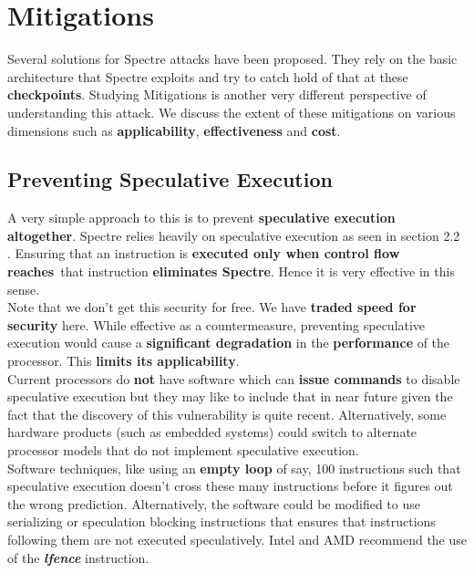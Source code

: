 \documentclass[12pt]{article}
\begin{document}
\newpage
\section{Mitigations\cite{Kocher2018spectre}}
Several solutions for Spectre attacks have been proposed. They rely on the basic architecture that Spectre exploits and try to catch hold of that at these \textbf{checkpoints}. Studying Mitigations is another very different perspective of understanding this attack. We discuss the extent of these mitigations on various dimensions such as \textbf{applicability}, \textbf{effectiveness} and \textbf{cost}.
\subsection{Preventing Speculative Execution}
A very simple approach to this is to prevent \textbf{speculative execution altogether}. Spectre relies heavily on speculative execution as seen in section 2.2 . Ensuring that an instruction is \textbf{executed only when control flow reaches}\ that instruction \textbf{eliminates Spectre}. Hence it is very effective in this sense.\\

 Note that we don't get this security for free. We have \textbf{traded speed for security} here. While effective as a countermeasure, preventing speculative execution would cause a \textbf{significant degradation} in the \textbf{performance} of the processor. This \textbf{limits its applicability}. \\

Current processors do \textbf{not} have software which can \textbf{issue commands} to disable speculative execution but they may like to include that in near future given the fact that the discovery of this vulnerability is quite recent. Alternatively, some hardware products (such as embedded systems) could switch to alternate processor models that do not implement speculative execution. \\

Software techniques, like using an \textbf{empty loop} of say, 100 instructions such that speculative execution doesn't cross these many instructions before it figures out the wrong prediction.
Alternatively, the software could be modified to use serializing or speculation blocking instructions that ensures that instructions following them are not executed speculatively. Intel and AMD recommend the use of the \textbf{\textit{lfence}} instruction.\\
\end{document}
